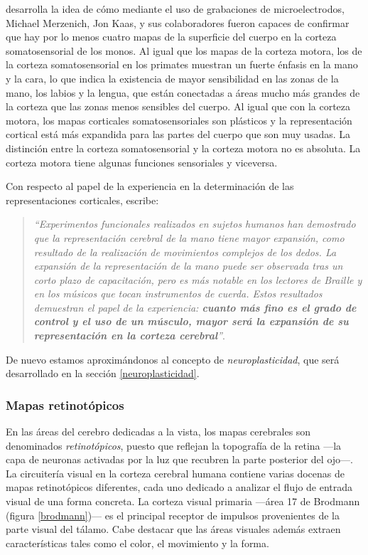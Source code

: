 \cite{JohnAllman2000} desarrolla la idea de cómo mediante el uso de grabaciones de microelectrodos, Michael Merzenich, Jon Kaas, y sus colaboradores fueron capaces de confirmar que hay por lo menos cuatro mapas de la superficie del cuerpo en la corteza somatosensorial de los monos. Al igual que los mapas de la corteza motora, los de la corteza somatosensorial en los primates muestran un fuerte énfasis en la mano y la cara, lo que indica la existencia de mayor sensibilidad en las zonas de la mano, los labios y la lengua, que están conectadas a áreas mucho más grandes de la corteza que  las zonas menos sensibles del cuerpo. Al igual que con la corteza motora, los mapas corticales somatosensoriales son plásticos y la representación cortical está más expandida para las partes del cuerpo que son muy usadas. La distinción entre la corteza somatosensorial y la corteza motora no es absoluta. La corteza motora tiene algunas funciones sensoriales y viceversa.

Con respecto al papel de la experiencia en la determinación de las representaciones corticales, \cite{JohnAllman2000} escribe: 

\begin{quote}
  {\it ``Experimentos funcionales realizados en sujetos humanos han demostrado que la representación cerebral de la mano tiene mayor expansión, como resultado de la realización de movimientos complejos de los dedos. La expansión de la representación de la mano puede ser observada tras un corto plazo de capacitación, pero es más notable en los lectores de Braille y en los músicos que tocan instrumentos de cuerda. Estos resultados demuestran el papel de la experiencia: \textit{\textbf{cuanto más fino es el grado de control y el uso de un músculo, mayor será la expansión de su representación en la corteza cerebral}}''}.  
\end{quote}

De nuevo estamos aproximándonos al concepto de {\it neuroplasticidad}, que será desarrollado en la sección \ref{neuroplasticidad}. 


\subsubsection{Mapas retinotópicos}

En las áreas del cerebro dedicadas a la vista, los mapas cerebrales son denominados {\it retinotópicos}, puesto que reflejan la topografía de la retina ---la capa de neuronas activadas por la luz que recubren la parte posterior del ojo---. La circuitería visual en la corteza cerebral humana contiene varias docenas de mapas retinotópicos diferentes, cada uno dedicado a analizar el flujo de entrada visual de una forma concreta. La corteza visual primaria ---área 17 de Brodmann (figura \ref{brodmann})--- es el principal receptor de impulsos provenientes de la parte visual del tálamo. Cabe destacar que las áreas visuales además extraen características tales como el color, el movimiento y la forma.

